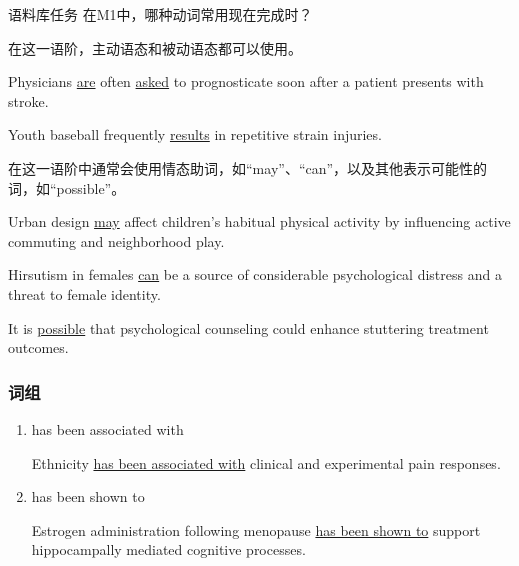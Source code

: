 \documentclass[a4paper]{ctexbook}
\begin{document}
    \begin{task}[label={myautocounter}]{\heiti 语料库任务}
      在M1中，哪种动词常用现在完成时？
    \end{task}

    在这一语阶，主动语态和被动语态都可以使用。

    \begin{eg}[label={myautocounter}]{}
      Physicians \uline{are} often \uline{asked} to prognosticate soon after a patient presents with stroke.
    \end{eg}

    \begin{eg}[label={myautocounter}]{}
      Youth baseball frequently \uline{results} in repetitive strain injuries.
    \end{eg}

    在这一语阶中通常会使用情态助词，如“may”、“can”，以及其他表示可能性的词，如“possible”。

    \begin{eg}[label={myautocounter}]{}
      Urban design \uline{may} affect children's habitual physical activity by influencing active commuting and neighborhood play.
    \end{eg}

    \begin{eg}[label={myautocounter}]{}
      Hirsutism in females \uline{can} be a source of considerable psychological distress and a threat to female identity.
    \end{eg}

    \begin{eg}[label={myautocounter}]{}
      It is \uline{possible} that psychological counseling could enhance stuttering treatment outcomes.
    \end{eg}

    \subsubsection{词组}

    \begin{enumerate}
      \item has been associated with
      \begin{eg}[label={myautocounter}]{}
        Ethnicity \uline{has been associated with} clinical and experimental pain responses.
      \end{eg}

      \item has been shown to
      \begin{eg}[label={myautocounter}]{}
        Estrogen administration following menopause \uline{has been shown to} support hippocampally mediated cognitive processes.
      \end{eg}
    \end{enumerate}
  
\end{document}
